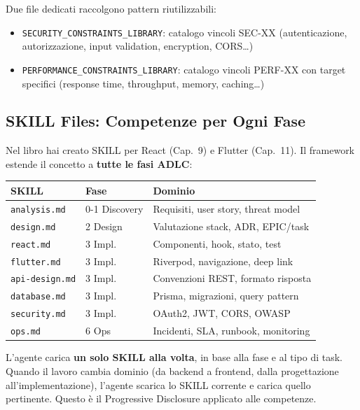 Due file dedicati raccolgono pattern riutilizzabili:
\begin{itemize}
  \item \texttt{SECURITY\_CONSTRAINTS\_LIBRARY}: catalogo vincoli SEC-XX (autenticazione, autorizzazione, input validation, encryption, CORS\ldots)
  \item \texttt{PERFORMANCE\_CONSTRAINTS\_LIBRARY}: catalogo vincoli PERF-XX con target specifici (response time, throughput, memory, caching\ldots)
\end{itemize}

\subsection{SKILL Files: Competenze per Ogni Fase}

Nel libro hai creato SKILL per React (Cap.~9) e Flutter (Cap.~11). Il framework estende il concetto a \textbf{tutte le fasi ADLC}:

\begin{center}
\begin{small}
\begin{tabularx}{\textwidth}{l l X}
\toprule
\textbf{SKILL} & \textbf{Fase} & \textbf{Dominio} \\
\midrule
\texttt{analysis.md} & 0-1 Discovery & Requisiti, user story, threat model \\
\texttt{design.md} & 2 Design & Valutazione stack, ADR, EPIC/task \\
\texttt{react.md} & 3 Impl. & Componenti, hook, stato, test \\
\texttt{flutter.md} & 3 Impl. & Riverpod, navigazione, deep link \\
\texttt{api-design.md} & 3 Impl. & Convenzioni REST, formato risposta \\
\texttt{database.md} & 3 Impl. & Prisma, migrazioni, query pattern \\
\texttt{security.md} & 3 Impl. & OAuth2, JWT, CORS, OWASP \\
\texttt{ops.md} & 6 Ops & Incidenti, SLA, runbook, monitoring \\
\bottomrule
\end{tabularx}
\end{small}
\end{center}

L'agente carica \textbf{un solo SKILL alla volta}, in base alla fase e al tipo di task. Quando il lavoro cambia dominio (da backend a frontend, dalla progettazione all'implementazione), l'agente scarica lo SKILL corrente e carica quello pertinente. Questo è il Progressive Disclosure applicato alle competenze.

